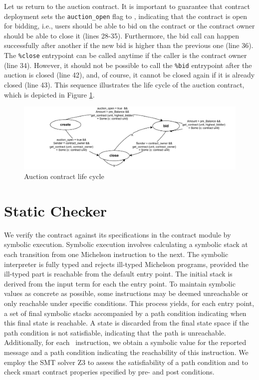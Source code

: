 \documentclass[a4paper,USenglish,cleveref, autoref, thm-restate]{lipics-v2021}
\begin{document}
Let us return to the auction contract. It is important to guarantee
that contract deployment sets the  \lstinline/auction_open/ flag to
\TRUE, indicating that the contract is open for bidding, i.e., users
should be able to bid on the contract or the contract owner should be
able to close it (lines 28-35). Furthermore, the bid call can happen
successfully after another if the new bid is higher than the previous
one (line 36). The  \lstinline/%close/ entrypoint can be called
anytime if the caller is the contract owner (line 34). However, it
should not be possible to call the  \lstinline/%bid/ entrypoint after
the auction is closed (line 42), and, of course, it cannot be closed
again if it is already closed (line 43). This sequence  illustrates
the life cycle of the auction contract, which is depicted in Figure
\ref{fig:auction-life-cycle}.

\begin{figure}[tp]
    \centering
    \includegraphics[width=1.1\textwidth]{auction-life-cycle}
    \caption{Auction contract life cycle}
    \label{fig:auction-life-cycle}
\end{figure}


\section{Static Checker}
\label{sec:static-checker-we}
We verify the contract against its specifications in the contract
module by symbolic execution. Symbolic execution involves calculating
a symbolic stack at each transition from one Michelson instruction to
the next. The symbolic interpreter is fully typed and rejects
ill-typed Michelson programs, provided the ill-typed part is reachable
from the default entry point.  The initial stack is derived from the
input term for each the entry point. To maintain symbolic values as
concrete as possible, some instructions may be deemed unreachable or
only reachable under specific conditions. This process yields, for
each entry point, a set of final symbolic stacks accompanied by a path
condition indicating when this final state is reachable. A state is
discarded from the final state space if the path condition is not
satisfiable, indicating that the path is unreachable. Additionally,
for each \FAILWITH\ instruction, we obtain a symbolic value for the
reported message and a path condition indicating the reachability of
this instruction. We employ the SMT solver Z3  to assess the
satisfiability of a path condition and to check smart contract
properies specified by pre- and post conditions.
\end{document}
